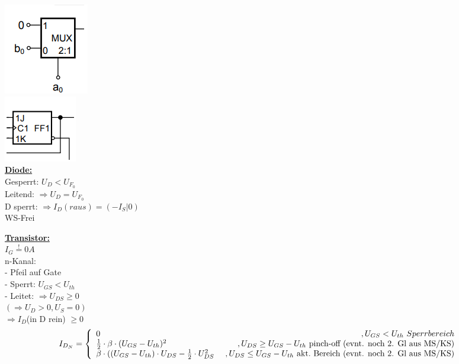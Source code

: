 \documentclass[11pt]{article}
\begin{document}
\newpage

\begin{minipage}{0.33\textwidth}
\vspace{-1cm}
\includegraphics[scale=0.40]{Mult.png}\\
\includegraphics[scale=0.40]{FF.png}\\

\underline{\textbf{Diode:}}\\
Gesperrt: $U_D < U_{F_0}$\\
Leitend: $\Rightarrow U_D = U_{F_0}$\\
D sperrt: $\Rightarrow I_D(raus) = (-I_S|0)$\\
WS-Frei

\underline{\textbf{Transistor:}}\\
$I_G \stackrel{!}{=} 0A$\\

n-Kanal:\\
- Pfeil auf Gate\\
- Sperrt: $U_{GS} < U_{th}$\\
- Leitet: $\Rightarrow U_{DS} \geq 0$\\
\phantom{sssssiisi} $ (\Rightarrow U_D > 0, U_S = 0)$\\
\phantom{sssssiisssi}$\Rightarrow I_D$(in D rein) $\geq 0$\\
\[I_{D_N} = \left\{
  \begin{array}{lr}
    0 & , U_{GS} < U_{th}~Sperrbereich\\
    \frac{1}{2} \cdot \beta \cdot(U_{GS} - U_{th})^2  \ & , U_{DS} \ge U_{GS} - U_{th}$~pinch-off (evnt. noch 2. Gl aus MS/KS)$\\
       \beta \cdot((U_{GS} - U_{th}) \cdot U_{DS} - \frac{1}{2} \cdot U_{DS}^2  \ & , U_{DS} \leq U_{GS} - U_{th}$~akt.~Bereich (evnt. noch 2. Gl aus MS/KS)$\\
  \end{array}
\right.
\]


\end{minipage}
\end{document}
